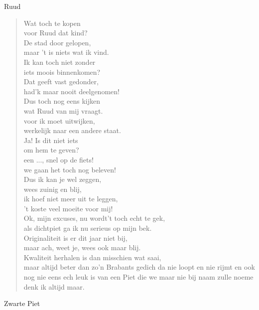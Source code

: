 \documentclass[12pt]{brief}
\date{4 december 2004}
\begin{document}
\begin{letter}{Ruud}

\opening{}


\begin{verse}

Wat toch te kopen\\
voor Ruud dat kind?\\
De stad door gelopen,\\
maar 't is niets wat ik vind.\\[0.5em]

Ik kan toch niet zonder\\
iets moois binnenkomen?\\
Dat geeft vast gedonder,\\
had'k maar nooit deelgenomen!\\[0.5em]

Dus toch nog eens kijken\\
wat Ruud van mij vraagt.\\
voor ik moet uitwijken,\\
werkelijk naar een andere staat.\\[0.5em]

Ja! Is dit niet iets\\
om hem te geven?\\
een ..., snel op de fiets!\\
we gaan het toch nog beleven!\\[0.5em]

Dus ik kan je wel zeggen,\\
wees zuinig en blij,\\
ik hoef niet meer uit te leggen,\\
't koste veel moeite voor mij!\\[2em]

Ok, mijn excuses, nu wordt't toch echt te gek,\\
als dichtpiet ga ik nu serieus op mijn bek.\\
Originaliteit is er dit jaar niet bij,\\
maar ach, weet je, wees ook maar blij.\\
Kwaliteit herhalen is dan misschien wat saai,\\
maar altijd beter dan zo'n Brabants gedich da nie loopt en nie rijmt en ook nog nie eens ech leuk is van een Piet die we maar nie bij naam zulle noeme denk ik altijd maar.\\[1.2em]

\end{verse}


Zwarte Piet


\closing{}

\end{letter}
\end{document}
